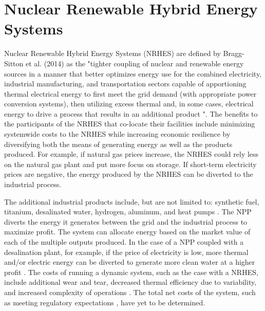 \documentclass[12pt]{UIdahoMastersThesis}
\begin{document}
\section{Nuclear Renewable Hybrid Energy Systems}
Nuclear Renewable Hybrid Energy Systems (NRHES) are defined by Bragg-Sitton et al. (2014) as the "tighter coupling of nuclear and renewable energy sources in a manner that better optimizes energy use for the combined electricity, industrial manufacturing, and transportation sectors capable of apportioning thermal electrical energy to first meet the grid demand (with appropriate power conversion systems), then utilizing excess thermal and, in some cases, electrical energy to drive a process that results in an additional product \cite {Bragg-Sitton2014}".  The benefits to the participants of the NRHES that co-locate their facilities include minimizing systemwide costs to the NRHES while increasing economic resilience by diversifying both the means of generating energy as well as the products produced. For example, if natural gas prices increase, the NRHES could rely less on the natural gas plant and put more focus on storage.  If short-term electricity prices are negative, the energy produced by the NRHES can be diverted to the industrial process.  

The additional industrial products include, but are not limited to: synthetic fuel, titanium, desalinated water, hydrogen, aluminum, and heat pumps \cite{Bienvenue2015}. The NPP diverts the energy it generates between the grid and the industrial process to maximize profit. The system can allocate energy based on the market value of each of the multiple outputs produced. In the case of a NPP coupled with a desalination plant, for example, if the price of electricity is low, more thermal and/or electric energy can be diverted to generate more clean water at a higher profit \cite {Chen2016}. The costs of running a dynamic system, such as the case with a NRHES, include additional wear and tear, decreased thermal efficiency  due to variability, and increased complexity of operations  \cite{Garcia2013}. The total net costs of the system, such as meeting regulatory expectations , have yet to be determined. 
\end{document}
